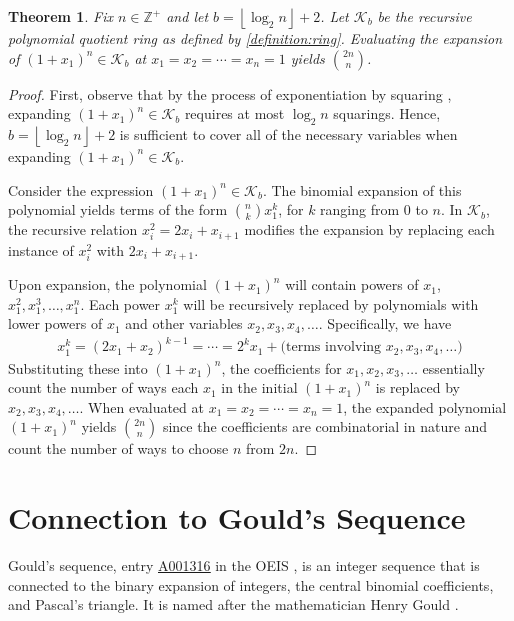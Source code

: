 \documentclass[12pt,reqno]{article}
\theoremstyle{plain}
\newtheorem{theorem}{Theorem}
\newcommand{\floor}[1]{\left\lfloor #1 \right\rfloor}
\newcommand{\Z}{\mathbb{Z}}
\newcommand{\K}{\mathcal{K}}
\newcommand{\seqnum}[1]{\href{https://oeis.org/#1}{\rm \underline{#1}}}
\begin{document}
\begin{theorem} \label{proof:cbc}
Fix $n \in \Z^+$ and let $b={\floor{\log_2 n}+2}$. Let $\K_b$ be the recursive polynomial quotient ring as defined by \cref{definition:ring}. Evaluating the expansion of $(1+x_1)^n \in \K_b$ at $x_1=x_2=\cdots=x_n=1$ yields $\binom{2n}{n}$.
\end{theorem}
\begin{proof}
First, observe that by the process of exponentiation by squaring \cite{knuth1997art}, expanding $(1+x_1)^n \in \K_b$ requires at most $\log_2 n$ squarings. Hence, $b={\floor{\log_2 n}+2}$ is sufficient to cover all of the necessary variables when expanding $(1+x_1)^n \in \K_b$.

Consider the expression $(1+x_1)^n \in \K_b$. The binomial expansion of this polynomial yields terms of the form $\binom{n}{k} x_1^k$, for $k$ ranging from $0$ to $n$. In $\K_b$, the recursive relation $x_i^2 = 2x_i + x_{i+1}$ modifies the expansion by replacing each instance of $x_i^2$ with $2x_i + x_{i+1}$.

Upon expansion, the polynomial $(1+x_1)^n$ will contain powers of $x_1$, $x_1^2, x_1^3, \ldots, x_1^n$. Each power $x_1^k$ will be recursively replaced by polynomials with lower powers of $x_1$ and other variables $x_2, x_3, x_4, \ldots$. Specifically, we have
\begin{align*}
    x_1^k = (2x_1+x_2)^{k-1} = \cdots = 2^k x_1 + \text{(terms involving $x_2, x_3, x_4, \ldots$)}
\end{align*}
Substituting these into $(1+x_1)^n$, the coefficients for $x_1, x_2, x_3, \ldots$ essentially count the number of ways each $x_1$ in the initial $(1+x_1)^n$ is replaced by $x_2, x_3, x_4, \ldots$. When evaluated at $x_1=x_2=\cdots=x_n=1$, the expanded polynomial $(1+x_1)^n$ yields $\binom{2n}{n}$ since the coefficients are combinatorial in nature and count the number of ways to choose $n$ from $2n$.
\end{proof}

\section{Connection to Gould's Sequence} \label{section:goulds}
Gould's sequence, entry \seqnum{A001316} in the OEIS \cite{A001316}, is an integer sequence that is connected to the binary expansion of integers, the central binomial coefficients, and Pascal's triangle. It is named after the mathematician Henry Gould \cite{A001316}.
\end{document}
